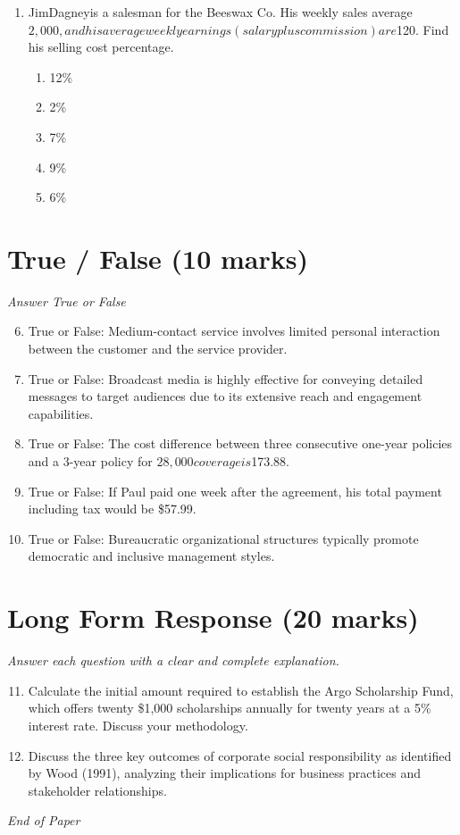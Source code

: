 \documentclass[12pt]{article}
\begin{document}
\begin{enumerate}[label=\arabic*.]
\begin{enumerate}[label=(\alph*)]
    \item \$2,000
    \item \$750
    \item \$1,500
\end{enumerate}
\item JimDagneyis a salesman for the Beeswax Co. His weekly sales average $2,000, and his average weekly earnings (salary plus commission) are $120. Find his selling cost percentage.
\begin{enumerate}[label=(\alph*)]
    \item 12\%
    \item 2\%
    \item 7\%
    \item 9\%
    \item 6\%
\end{enumerate}
\end{enumerate}

\section*{True / False (10 marks)}
\textit{Answer True or False}
\begin{enumerate}[label=\arabic*.]
\setcounter{enumi}{5}
\item True or False: Medium-contact service involves limited personal interaction between the customer and the service provider.
\item True or False: Broadcast media is highly effective for conveying detailed messages to target audiences due to its extensive reach and engagement capabilities.
\item True or False: The cost difference between three consecutive one-year policies and a 3-year policy for $28,000 coverage is $173.88.
\item True or False: If Paul paid one week after the agreement, his total payment including tax would be \$57.99.
\item True or False: Bureaucratic organizational structures typically promote democratic and inclusive management styles.
\end{enumerate}

\section*{Long Form Response (20 marks)}
\textit{Answer each question with a clear and complete explanation.}
\begin{enumerate}[label=\arabic*.]
\setcounter{enumi}{10}
\item Calculate the initial amount required to establish the Argo Scholarship Fund, which offers twenty \$1,000 scholarships annually for twenty years at a 5\% interest rate. Discuss your methodology.
\item Discuss the three key outcomes of corporate social responsibility as identified by Wood (1991), analyzing their implications for business practices and stakeholder relationships.
\end{enumerate}

\vfill
\noindent\textit{End of Paper}
\end{document}
